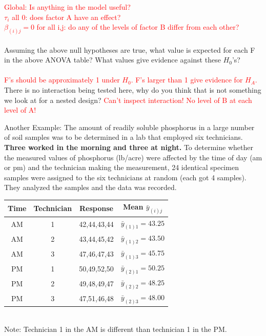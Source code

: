 \textcolor{red}{Global: Is anything in the model useful?\\
$\tau_i$ all 0: does factor A have an effect?\\
$\beta_{(i)j}=0$ for all i,j: do any of the levels of factor B differ from each other?}\\~\\
Assuming the above null hypotheses are true, what value is expected for each F in the above ANOVA table?  What values give evidence against these
$H_0$'s?\\~\\%
\textcolor{red}{F's should be approximately 1 under $H_0$.  F's larger than 1 give evidence for $H_A$.}
\\

There is no interaction being tested here, why do you think that is not something we look at for a nested design?
\textcolor{red}{Can't inspect interaction!  No level of B at each level of A!}

\newpage

\noindent Another Example: The amount of readily soluble phosphorus in a large number of soil samples was to be determined in a lab that employed six technicians.  \textbf{Three worked in the morning and three at night.}  To determine whether the measured values of phosphorus (lb/acre) were affected by the time of day (am or pm) and the technician making the measurement, 24 identical specimen samples were assigned to the six technicians at random (each got 4 samples).  They analyzed the samples and the data was recorded. \\
\begin{center}
\begin{tabular}{cc|c|c}
Time & Technician & Response & Mean $\bar{y}_{(i)j}$\\\hline
AM & 1 &42,44,43,44 & $\bar{y}_{(1)1}=43.25$\\
AM & 2&43,44,45,42& $\bar{y}_{(1)2}=43.50$\\
AM &3&47,46,47,43& $\bar{y}_{(1)3}=45.75$\\
PM &1&50,49,52,50& $\bar{y}_{(2)1}=50.25$\\
PM &2&49,48,49,47& $\bar{y}_{(2)2}=48.25$\\
PM &3&47,51,46,48& $\bar{y}_{(2)3}=48.00$\\
\end{tabular}	
~\\Note: Technician 1 in the AM is different than technician 1 in the PM.
\end{center}

